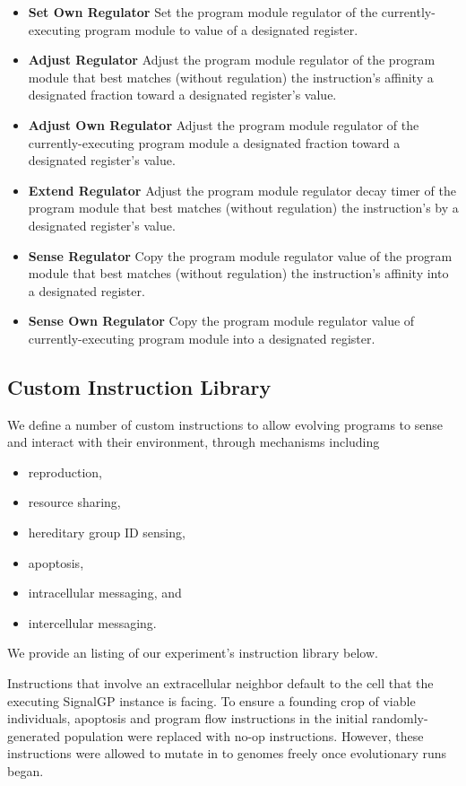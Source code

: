 \begin{itemize}
\item \textbf{Set Own Regulator}
Set the program module regulator of the currently-executing program module to value of a designated register.
\item \textbf{Adjust Regulator}
Adjust the program module regulator of the program module that best matches (without regulation) the instruction's affinity a designated fraction toward a designated register's value.
\item \textbf{Adjust Own Regulator}
Adjust the program module regulator of the currently-executing program module a designated fraction toward a designated register's value.
\item \textbf{Extend Regulator}
Adjust the program module regulator decay timer of the program module that best matches (without regulation) the instruction's by a designated register's value.
\item \textbf{Sense Regulator}
Copy the program module regulator value of the program module that best matches (without regulation) the instruction's affinity into a designated register.
\item \textbf{Sense Own Regulator}
Copy the program module regulator value of currently-executing program module into a designated register.
\end{itemize}

\subsection{Custom Instruction Library} \label{sup:custom_instruction_library}

We define a number of custom instructions to allow evolving programs to sense and interact with their environment, through mechanisms including
\begin{itemize}
\item reproduction,
\item resource sharing,
\item hereditary group ID sensing,
\item apoptosis,
\item intracellular messaging, and
\item intercellular messaging.
\end{itemize}

We provide an listing of our experiment's instruction library below.

Instructions that involve an extracellular neighbor default to the cell that the executing SignalGP instance is facing.
To ensure a founding crop of viable individuals, apoptosis and program flow instructions in the initial randomly-generated population were replaced with no-op instructions.
However, these instructions were allowed to mutate in to genomes freely once evolutionary runs began.

